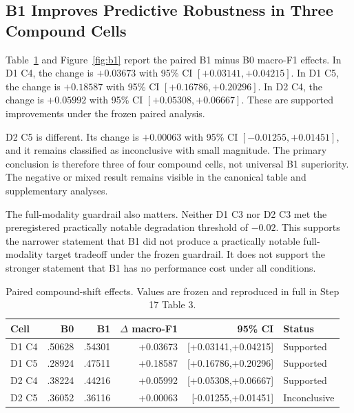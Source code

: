 \documentclass[11pt]{article}
\begin{document}
\subsection{B1 Improves Predictive Robustness in Three Compound Cells}
Table~\ref{tab:b1} and Figure~\ref{fig:b1} report the paired B1 minus B0 macro-F1 effects. In D1 C4, the change is $+0.03673$ with 95\% CI $[+0.03141,+0.04215]$. In D1 C5, the change is $+0.18587$ with 95\% CI $[+0.16786,+0.20296]$. In D2 C4, the change is $+0.05992$ with 95\% CI $[+0.05308,+0.06667]$. These are supported improvements under the frozen paired analysis.

D2 C5 is different. Its change is $+0.00063$ with 95\% CI $[-0.01255,+0.01451]$, and it remains classified as inconclusive with small magnitude. The primary conclusion is therefore three of four compound cells, not universal B1 superiority. The negative or mixed result remains visible in the canonical table and supplementary analyses.

The full-modality guardrail also matters. Neither D1 C3 nor D2 C3 met the preregistered practically notable degradation threshold of $-0.02$. This supports the narrower statement that B1 did not produce a practically notable full-modality target tradeoff under the frozen guardrail. It does not support the stronger statement that B1 has no performance cost under all conditions.

\begin{table}[t]
\centering\small
\caption{Paired compound-shift effects. Values are frozen and reproduced in full in Step 17 Table 3.}
\label{tab:b1}
\begin{tabular}{lrrrrl}
\toprule
Cell & B0 & B1 & $\Delta$ macro-F1 & 95\% CI & Status\\
\midrule
D1 C4 & .50628 & .54301 & +0.03673 & [+0.03141,+0.04215] & Supported\\
D1 C5 & .28924 & .47511 & +0.18587 & [+0.16786,+0.20296] & Supported\\
D2 C4 & .38224 & .44216 & +0.05992 & [+0.05308,+0.06667] & Supported\\
D2 C5 & .36052 & .36116 & +0.00063 & [-0.01255,+0.01451] & Inconclusive\\
\bottomrule
\end{tabular}
\end{table}
\end{document}
